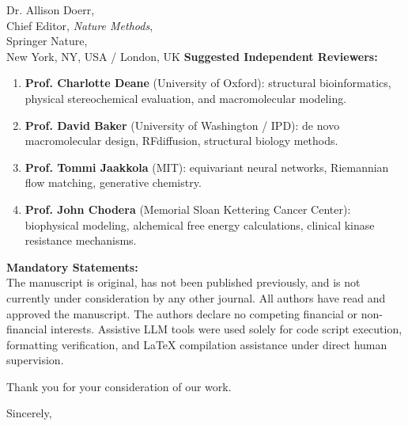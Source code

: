 \documentclass[11pt]{letter}
\begin{document}
\begin{letter}{%
    Dr. Allison Doerr,\\
    Chief Editor, \textit{Nature Methods},\\
    Springer Nature,\\
    New York, NY, USA / London, UK
}
\textbf{Suggested Independent Reviewers:}
\begin{enumerate}
    \item \textbf{Prof. Charlotte Deane} (University of Oxford): structural bioinformatics, physical stereochemical evaluation, and macromolecular modeling.
    \item \textbf{Prof. David Baker} (University of Washington / IPD): de novo macromolecular design, RFdiffusion, structural biology methods.
    \item \textbf{Prof. Tommi Jaakkola} (MIT): equivariant neural networks, Riemannian flow matching, generative chemistry.
    \item \textbf{Prof. John Chodera} (Memorial Sloan Kettering Cancer Center): biophysical modeling, alchemical free energy calculations, clinical kinase resistance mechanisms.
\end{enumerate}

\textbf{Mandatory Statements:}\\
The manuscript is original, has not been published previously, and is not currently under consideration by any other journal. All authors have read and approved the manuscript. The authors declare no competing financial or non-financial interests. Assistive LLM tools were used solely for code script execution, formatting verification, and LaTeX compilation assistance under direct human supervision.

Thank you for your consideration of our work.

\closing{Sincerely,}


\end{letter}
\end{document}
